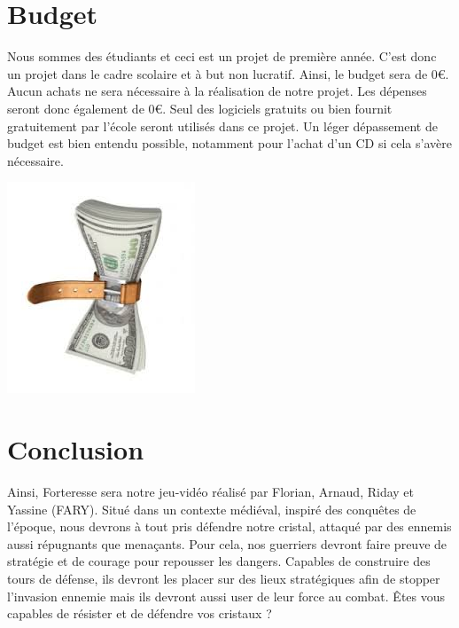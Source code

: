 \documentclass[a4paper, 12pt]{article}
\begin{document}
\section{Budget}

Nous sommes des étudiants et ceci est un projet de première année. C'est donc un projet dans le cadre scolaire et à but non lucratif. Ainsi, le budget sera de 0\euro{}. Aucun achats ne sera nécessaire à la réalisation de notre projet. Les dépenses seront donc également de 0\euro{}. Seul des logiciels gratuits ou bien fournit gratuitement par l'école seront utilisés dans ce projet. Un léger dépassement de budget est bien entendu possible, notamment pour l'achat d'un CD si cela s'avère nécessaire.\\
\centerline{\includegraphics[scale=0.7]{images.jpg}}

\section{Conclusion}

Ainsi, Forteresse sera notre jeu-vidéo réalisé par Florian, Arnaud, Riday et Yassine (FARY). Situé dans un contexte médiéval, inspiré des conquêtes de l’époque, nous devrons à tout pris défendre notre cristal, attaqué par des ennemis aussi répugnants que menaçants. Pour cela, nos guerriers devront faire preuve de stratégie et de courage pour repousser les dangers. Capables de construire des tours de défense, ils devront les placer sur des lieux stratégiques afin de stopper l’invasion ennemie mais ils devront aussi user de leur force au combat.
Êtes vous capables de résister et de défendre vos cristaux ?
\end{document}
